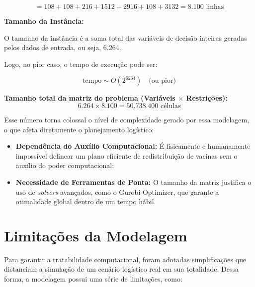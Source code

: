 \[
= 108 + 108 + 216 + 1512 + 2916 + 108 + 3132 = 8.100 \text{ linhas}
\]


\textbf{Tamanho da Instância:}

O tamanho da instância é a soma total das variáveis de decisão inteiras geradas pelos dados de entrada, ou seja, 6.264.

Logo, no pior caso, o tempo de execução pode ser:

\[
\text{tempo} \sim O(2^{6264}) \quad \text{(ou pior)}
\]

\textbf{Tamanho total da matriz do problema (Variáveis $\times$ Restrições):}
\[
6.264 \times 8.100 = 50.738.400 \text{ células}
\]


Esse número torna colossal o nível de complexidade gerado por essa modelagem, o que afeta diretamente o planejamento logístico:
\begin{itemize}
    \item \textbf{Dependência do Auxílio Computacional:} É fisicamente e humanamente impossível delinear um plano eficiente de redistribuição de vacinas sem o auxílio do poder computacional;
    \item \textbf{Necessidade de Ferramentas de Ponta:} O tamanho da matriz justifica o uso de \textit{solvers} avançados, como o Gurobi Optimizer, que garante a otimalidade global dentro de um tempo hábil.
\end{itemize}

\section{Limitações da Modelagem}

Para garantir a tratabilidade computacional, foram adotadas simplificações que distanciam a simulação de um cenário logístico real em sua totalidade. Dessa forma, a modelagem possui uma série de limitações, como:

